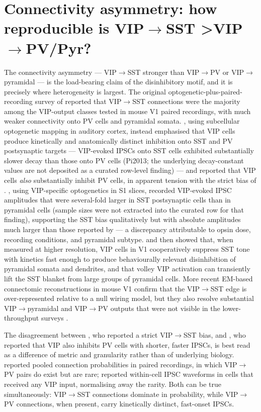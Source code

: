 \documentclass[11pt]{article}
\let\origrightarrow\rightarrow
\def\rightarrow{\ensuremath{\origrightarrow}}
\begin{document}
\section{Connectivity asymmetry: how reproducible is VIP\rightarrow SST \textgreater  VIP\rightarrow PV/Pyr?}

The connectivity asymmetry --- VIP\rightarrow SST stronger than VIP\rightarrow PV or VIP\rightarrow pyramidal --- is the load-bearing claim of the disinhibitory motif, and it is precisely where heterogeneity is largest. The original optogenetic-plus-paired-recording survey of \citet{Pfeffer2013} reported that VIP\rightarrow SST connections were the majority among the VIP-output classes tested in mouse V1 paired recordings, with much weaker connectivity onto PV cells and pyramidal somata. \citet{Pi2013}, using subcellular optogenetic mapping in auditory cortex, instead emphasised that VIP cells produce kinetically and anatomically distinct inhibition onto SST and PV postsynaptic targets --- VIP-evoked IPSCs onto SST cells exhibited substantially slower decay than those onto PV cells (Pi2013; the underlying decay-constant values are not deposited as a curated row-level finding) --- and reported that VIP cells \textit{also} substantially inhibit PV cells, in apparent tension with the strict bias of \citep{Pfeffer2013}. \citet{Lee2013}, using VIP-specific optogenetics in S1 slices, recorded VIP-evoked IPSC amplitudes that were several-fold larger in SST postsynaptic cells than in pyramidal cells (sample sizes were not extracted into the curated row for that finding), supporting the SST bias qualitatively but with absolute amplitudes much larger than those reported by \citet{Pfeffer2013} --- a discrepancy attributable to opsin dose, recording conditions, and pyramidal subtype. \citet{Karnani2016a} and \citet{Karnani2016b} then showed that, when measured at higher resolution, VIP cells in V1 cooperatively suppress SST tone with kinetics fast enough to produce behaviourally relevant disinhibition of pyramidal somata and dendrites, and that volley VIP activation can transiently lift the SST blanket from large groups of pyramidal cells. More recent EM-based connectomic reconstructions in mouse V1 confirm that the VIP\rightarrow SST edge is over-represented relative to a null wiring model, but they also resolve substantial VIP\rightarrow pyramidal and VIP\rightarrow PV outputs that were not visible in the lower-throughput surveys \citep{Schneidermizell2025}.

The disagreement between \citet{Pfeffer2013}, who reported a strict VIP\rightarrow SST bias, and \citet{Pi2013}, who reported that VIP also inhibits PV cells with shorter, faster IPSCs, is best read as a difference of metric and granularity rather than of underlying biology. \citet{Pfeffer2013} reported pooled connection probabilities in paired recordings, in which VIP\rightarrow PV pairs do exist but are rare; \citet{Pi2013} reported within-cell IPSC waveforms in cells that received any VIP input, normalising away the rarity. Both can be true simultaneously: VIP\rightarrow SST connections dominate in probability, while VIP\rightarrow PV connections, when present, carry kinetically distinct, fast-onset IPSCs.
\end{document}
